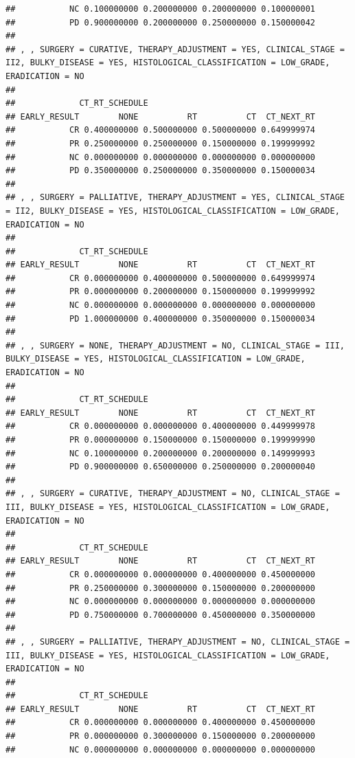 \documentclass[]{article}
\begin{document}
\begin{verbatim}
##           NC 0.100000000 0.200000000 0.200000000 0.100000001
##           PD 0.900000000 0.200000000 0.250000000 0.150000042
## 
## , , SURGERY = CURATIVE, THERAPY_ADJUSTMENT = YES, CLINICAL_STAGE = II2, BULKY_DISEASE = YES, HISTOLOGICAL_CLASSIFICATION = LOW_GRADE, ERADICATION = NO
## 
##             CT_RT_SCHEDULE
## EARLY_RESULT        NONE          RT          CT  CT_NEXT_RT
##           CR 0.400000000 0.500000000 0.500000000 0.649999974
##           PR 0.250000000 0.250000000 0.150000000 0.199999992
##           NC 0.000000000 0.000000000 0.000000000 0.000000000
##           PD 0.350000000 0.250000000 0.350000000 0.150000034
## 
## , , SURGERY = PALLIATIVE, THERAPY_ADJUSTMENT = YES, CLINICAL_STAGE = II2, BULKY_DISEASE = YES, HISTOLOGICAL_CLASSIFICATION = LOW_GRADE, ERADICATION = NO
## 
##             CT_RT_SCHEDULE
## EARLY_RESULT        NONE          RT          CT  CT_NEXT_RT
##           CR 0.000000000 0.400000000 0.500000000 0.649999974
##           PR 0.000000000 0.200000000 0.150000000 0.199999992
##           NC 0.000000000 0.000000000 0.000000000 0.000000000
##           PD 1.000000000 0.400000000 0.350000000 0.150000034
## 
## , , SURGERY = NONE, THERAPY_ADJUSTMENT = NO, CLINICAL_STAGE = III, BULKY_DISEASE = YES, HISTOLOGICAL_CLASSIFICATION = LOW_GRADE, ERADICATION = NO
## 
##             CT_RT_SCHEDULE
## EARLY_RESULT        NONE          RT          CT  CT_NEXT_RT
##           CR 0.000000000 0.000000000 0.400000000 0.449999978
##           PR 0.000000000 0.150000000 0.150000000 0.199999990
##           NC 0.100000000 0.200000000 0.200000000 0.149999993
##           PD 0.900000000 0.650000000 0.250000000 0.200000040
## 
## , , SURGERY = CURATIVE, THERAPY_ADJUSTMENT = NO, CLINICAL_STAGE = III, BULKY_DISEASE = YES, HISTOLOGICAL_CLASSIFICATION = LOW_GRADE, ERADICATION = NO
## 
##             CT_RT_SCHEDULE
## EARLY_RESULT        NONE          RT          CT  CT_NEXT_RT
##           CR 0.000000000 0.000000000 0.400000000 0.450000000
##           PR 0.250000000 0.300000000 0.150000000 0.200000000
##           NC 0.000000000 0.000000000 0.000000000 0.000000000
##           PD 0.750000000 0.700000000 0.450000000 0.350000000
## 
## , , SURGERY = PALLIATIVE, THERAPY_ADJUSTMENT = NO, CLINICAL_STAGE = III, BULKY_DISEASE = YES, HISTOLOGICAL_CLASSIFICATION = LOW_GRADE, ERADICATION = NO
## 
##             CT_RT_SCHEDULE
## EARLY_RESULT        NONE          RT          CT  CT_NEXT_RT
##           CR 0.000000000 0.000000000 0.400000000 0.450000000
##           PR 0.000000000 0.300000000 0.150000000 0.200000000
##           NC 0.000000000 0.000000000 0.000000000 0.000000000

\end{verbatim}
\end{document}
